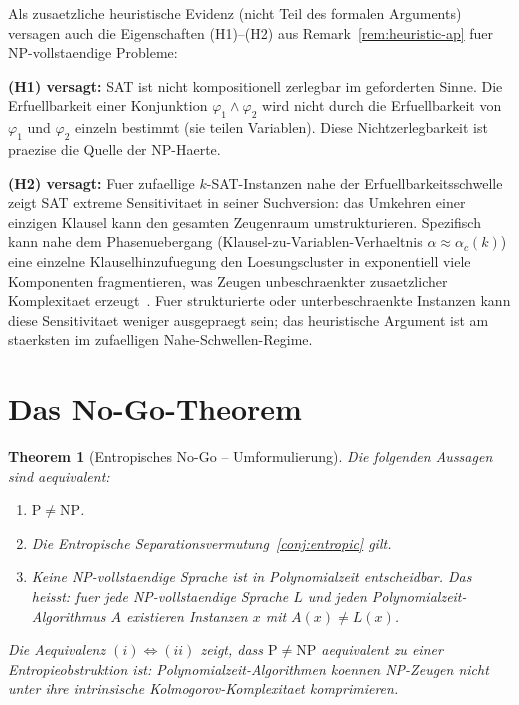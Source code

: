 \documentclass[aps,prd,twocolumn,superscriptaddress,nofootinbib]{revtex4-2}
\newtheorem{theorem}{Theorem}[section]
\theoremstyle{definition}
\theoremstyle{remark}
\newcommand{\NP}{\mathrm{NP}}
\newcommand{\PP}{\mathrm{P}}
\begin{document}
Als zusaetzliche heuristische Evidenz (nicht Teil des formalen Arguments) versagen auch die Eigenschaften (H1)--(H2) aus Remark~\ref{rem:heuristic-ap} fuer NP-vollstaendige Probleme:

\textbf{(H1) versagt:} SAT ist nicht kompositionell zerlegbar im geforderten Sinne. Die Erfuellbarkeit einer Konjunktion $\varphi_1 \wedge \varphi_2$ wird nicht durch die Erfuellbarkeit von $\varphi_1$ und $\varphi_2$ einzeln bestimmt (sie teilen Variablen). Diese Nichtzerlegbarkeit ist praezise die Quelle der NP-Haerte.

\textbf{(H2) versagt:} Fuer zufaellige $k$-SAT-Instanzen nahe der Erfuellbarkeitsschwelle zeigt SAT extreme Sensitivitaet in seiner Suchversion: das Umkehren einer einzigen Klausel kann den gesamten Zeugenraum umstrukturieren. Spezifisch kann nahe dem Phasenuebergang (Klausel-zu-Variablen-Verhaeltnis $\alpha \approx \alpha_c(k)$) eine einzelne Klauselhinzufuegung den Loesungscluster in exponentiell viele Komponenten fragmentieren, was Zeugen unbeschraenkter zusaetzlicher Komplexitaet erzeugt~\cite{AchlioptasRicci2006,MezardZecchina2002}. Fuer strukturierte oder unterbeschraenkte Instanzen kann diese Sensitivitaet weniger ausgepraegt sein; das heuristische Argument ist am staerksten im zufaelligen Nahe-Schwellen-Regime.


\section{Das No-Go-Theorem}
\label{sec:nogo}

\begin{theorem}[Entropisches No-Go -- Umformulierung]
\label{thm:nogo}
Die folgenden Aussagen sind aequivalent:
\begin{enumerate}
\item[(i)] $\PP \neq \NP$.
\item[(ii)] Die Entropische Separationsvermutung~\ref{conj:entropic} gilt.
\item[(iii)] Keine NP-vollstaendige Sprache ist in Polynomialzeit entscheidbar. Das heisst: fuer jede NP-vollstaendige Sprache $L$ und jeden Polynomialzeit-Algorithmus $A$ existieren Instanzen $x$ mit $A(x) \neq L(x)$.
\end{enumerate}
Die Aequivalenz $(i) \Leftrightarrow (ii)$ zeigt, dass $\PP \neq \NP$ \textit{aequivalent} zu einer Entropieobstruktion ist: Polynomialzeit-Algorithmen koennen NP-Zeugen nicht unter ihre intrinsische Kolmogorov-Komplexitaet komprimieren.
\end{theorem}
\end{document}
